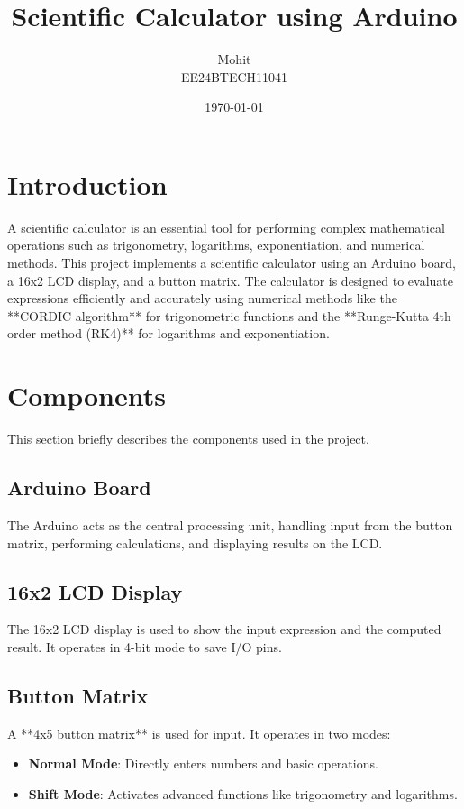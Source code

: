\documentclass[a4paper,12pt]{article}
\title{\textbf{Scientific Calculator using Arduino}}
\author{Mohit\\EE24BTECH11041}
\date{\today}
\begin{document}
\maketitle
\newpage
\tableofcontents

\newpage

\section{Introduction}
A scientific calculator is an essential tool for performing complex mathematical operations such as trigonometry, logarithms, exponentiation, and numerical methods. This project implements a scientific calculator using an Arduino board, a 16x2 LCD display, and a button matrix. The calculator is designed to evaluate expressions efficiently and accurately using numerical methods like the **CORDIC algorithm** for trigonometric functions and the **Runge-Kutta 4th order method (RK4)** for logarithms and exponentiation.

\section{Components}
This section briefly describes the components used in the project.

\subsection{Arduino Board}
The Arduino acts as the central processing unit, handling input from the button matrix, performing calculations, and displaying results on the LCD.

\subsection{16x2 LCD Display}
The 16x2 LCD display is used to show the input expression and the computed result. It operates in 4-bit mode to save I/O pins.

\subsection{Button Matrix}
A **4x5 button matrix** is used for input. It operates in two modes:
\begin{itemize}
    \item \textbf{Normal Mode}: Directly enters numbers and basic operations.
    \item \textbf{Shift Mode}: Activates advanced functions like trigonometry and logarithms.
\end{itemize}
\end{document}
